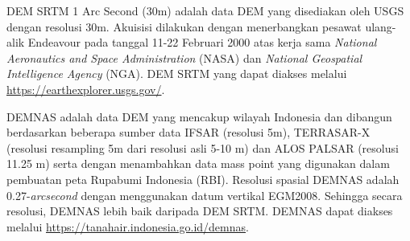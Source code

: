 \hspace{25pt}DEM SRTM 1 Arc Second (30m) adalah data DEM yang disediakan oleh USGS dengan resolusi 30m. Akuisisi dilakukan dengan menerbangkan pesawat ulang-alik Endeavour pada tanggal 11-22 Februari 2000 atas kerja sama \textit{National Aeronautics and Space Administration} (NASA) dan \textit{National Geospatial Intelligence Agency} (NGA). DEM SRTM yang dapat diakses melalui \href{https://earthexplorer.usgs.gov/}{https://earthexplorer.usgs.gov/}\citep{USGSDEM2018}. 

\hspace{25pt}DEMNAS adalah data DEM yang mencakup wilayah Indonesia dan dibangun berdasarkan beberapa sumber data IFSAR (resolusi 5m), TERRASAR-X (resolusi resampling 5m dari resolusi asli 5-10 m) dan ALOS PALSAR (resolusi 11.25 m) serta dengan menambahkan data mass point yang digunakan dalam pembuatan peta Rupabumi Indonesia (RBI). Resolusi spasial DEMNAS adalah 0.27-\textit{arcsecond} dengan menggunakan datum vertikal EGM2008. Sehingga secara resolusi, DEMNAS lebih baik daripada DEM SRTM. DEMNAS dapat diakses melalui \href{https://tanahair.indonesia.go.id/demnas}{https://tanahair.indonesia.go.id/demnas}\citep{DEMNAS}.

